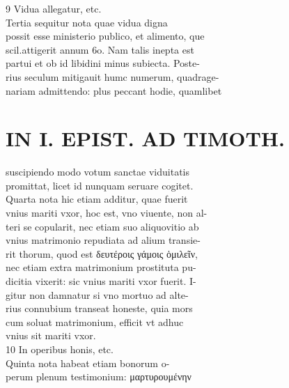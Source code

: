 \documentclass{article}
\begin{document}
\begin{pages}
                9 Vidua allegatur, etc. \\
                Tertia sequitur nota quae vidua digna \\
                possit esse ministerio publico, et alimento, que \\
                scil.attigerit annum 6o. Nam talis inepta est \\
                partui et ob id libidini minus subiecta. Poste- \\
                rius seculum mitigauit humc numerum, quadrage- \\
                nariam admittendo: plus peccant hodie, quamlibet \\
                
\section*{IN I. EPIST. AD TIMOTH. \\
                }suscipiendo modo votum sanctae viduitatis \\
                promittat, licet id nunquam seruare cogitet. \\
                Quarta nota hic etiam additur, quae fuerit \\
                vnius mariti vxor, hoc est, vno viuente, non al- \\
                teri se copularit, nec etiam suo aliquovitio ab \\
                vnius matrimonio repudiata ad alium transie- \\
                rit thorum, quod est δευτέροις γάμοις ὁμιλεῖν, \\
                nec etiam extra matrimonium prostituta pu- \\
                dicitia vixerit: sic vnius mariti vxor fuerit. I- \\
                gitur non damnatur si vno mortuo ad alte- \\
                rius connubium transeat honeste, quia mors \\
                cum soluat matrimonium, efficit vt adhuc \\
                vnius sit mariti vxor. \\
                10 In operibus honis, etc. \\
                Quinta nota habeat etiam bonorum o- \\
                perum plenum testimonium: μαρτυρουμένην \\

\end{pages}
\end{document}
